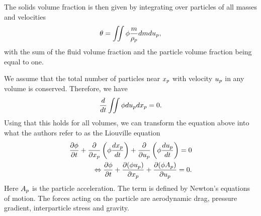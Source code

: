 The solids volume fraction is then given by integrating over particles of all masses and velocities
\begin{equation}
    \label{eq:svf}
    \pvf = \MultiIntegral{2} \pd \dfrac{\m}{\rp} d \m d \up,
\end{equation}
with the sum of the fluid volume fraction and the particle volume fraction being equal to one.

We assume that the total number of particles near $x_p$ with velocity $u_p$ in any volume is conserved. Therefore, we have
\begin{equation}
\label{eq:partConservation}
    \dfrac{d}{dt} \MultiIntegral{2} \pd d \up d \xp = 0.
\end{equation}
Using that this holds for all volumes, we can transform the equation above into what the authors refer to as the Liouville equation
\begin{align}
    \dfrac{\partial \pd}{\partial \tvar} + \dfrac{\partial}{\partial \xp} \left( \pd \dfrac{d \xp}{d \tvar} \right)+ \dfrac{\partial}{\partial \up} \left( \pd \dfrac{d \up}{d \tvar} \right) = 0 \\
    \label{eq:Liouville}
    \Leftrightarrow \dfrac{\partial \pd}{\partial \tvar} + \dfrac{\partial (\pd \up)}{\partial \xp} + \dfrac{\partial (\pd \Ap)}{\partial \up} = 0. %
\end{align}
Here $A_p$ is the particle acceleration. The term is defined by Newton's equations of motion. The forces acting on the particle are aerodynamic drag, pressure gradient, interparticle stress and gravity.
